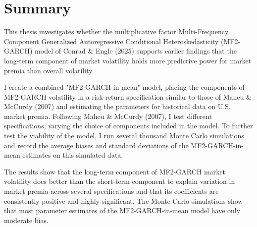 \documentclass[12pt]{article}
\begin{document}
\section*{Summary}
This thesis investigates whether the multiplicative factor Multi-Frequency Component Generalized Autoregressive Conditional Heteroskedasticity (MF2-GARCH) model of Conrad \& Engle (2025) supports earlier findings that the long-term component of market volatility holds more predictive power for market premia than overall volatility.\par
I create a combined "MF2-GARCH-in-mean" model, placing the components of MF2-GARCH volatility in a risk-return specification similar to those of Maheu \& McCurdy (2007) and estimating the parameters for historical data on U.S. market premia. Following Maheu \& McCurdy (2007), I test different specifications, varying the choice of components included in the model. To further test the viability of the model, I run several thousand Monte Carlo simulations and record the average biases and standard deviations of the MF2-GARCH-in-mean estimates on this simulated data.\par
The results show that the long-term component of MF2-GARCH market volatility does better than the short-term component to explain variation in market premia across several specifications and that its coefficients are consistently positive and highly significant. The Monte Carlo simulations show that most parameter estimates of the MF2-GARCH-in-mean model have only moderate bias.\par


\newpage
\end{document}
